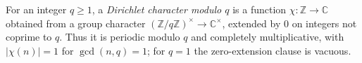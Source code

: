 
For an integer $q\ge1$, a \emph{Dirichlet character modulo $q$} is a function $\chi:\mathbb Z\to\mathbb C$ obtained from a group character $(\mathbb Z/q\mathbb Z)^\times\to\mathbb C^\times$, extended by $0$ on integers not coprime to $q$. Thus it is periodic modulo $q$ and completely multiplicative, with $|\chi(n)|=1$ for $\gcd(n,q)=1$; for $q=1$ the zero-extension clause is vacuous.
